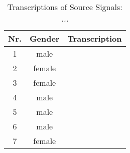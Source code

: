 \begin{table}[htb]
	\small
	\begin{tabularx}{\textwidth}{ccX}
		\toprule
		Nr. & Gender & Transcription                                       \\
		\midrule
		1   & male   &            \\
		2   & female &            \\
		3   & female &            \\
		4   & male   &            \\
		5   & male   &            \\
		6   & male   &            \\
		7   & female & \itshape{} \\
		\bottomrule
	\end{tabularx}
	\caption[Transcriptions of Source Signals]{Transcriptions of Source Signals: \itshape ...}
	\label{table:source-signals}
\end{table}